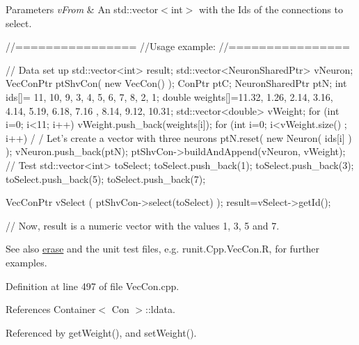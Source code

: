 \begin{DoxyParams}{Parameters}
{\em vFrom} & An std::vector$<$int$>$ with the Ids of the connections to select.\\
\hline
\end{DoxyParams}

\begin{DoxyCode}
        //================
        //Usage example:
        //================

        // Data set up
                std::vector<int> result;
                std::vector<NeuronSharedPtr> vNeuron;
                VecConPtr ptShvCon( new VecCon() );
                ConPtr    ptC;
                NeuronSharedPtr ptN;
                int ids[]= {11, 10, 9, 3, 4, 5, 6, 7, 8, 2, 1};
                double weights[]={11.32, 1.26, 2.14, 3.16, 4.14, 5.19, 6.18, 7.16
      , 8.14, 9.12, 10.31};
                std::vector<double> vWeight;
                for (int i=0; i<11; i++) {
                        vWeight.push_back(weights[i]);
                }
                for (int i=0; i<vWeight.size() ; i++) {                         /
      / Let's create a vector with three neurons
                        ptN.reset( new Neuron( ids[i] ) );
                        vNeuron.push_back(ptN);
                }
                ptShvCon->buildAndAppend(vNeuron, vWeight);
                // Test
                std::vector<int> toSelect;
                toSelect.push_back(1);
                toSelect.push_back(3);
                toSelect.push_back(5);
                toSelect.push_back(7);

                VecConPtr  vSelect (  ptShvCon->select(toSelect)  );
                result=vSelect->getId();

                // Now, result is a numeric vector with the values 1, 3, 5 and 7.
      
\end{DoxyCode}


\begin{DoxySeeAlso}{See also}
\hyperlink{classvec_con_aa9cc2fde90ddf466e820f929ead4fb0b}{erase} and the unit test files, e.g. runit.Cpp.VecCon.R, for further examples. 
\end{DoxySeeAlso}


Definition at line 497 of file VecCon.cpp.



References Container$<$ Con $>$::ldata.



Referenced by getWeight(), and setWeight().


